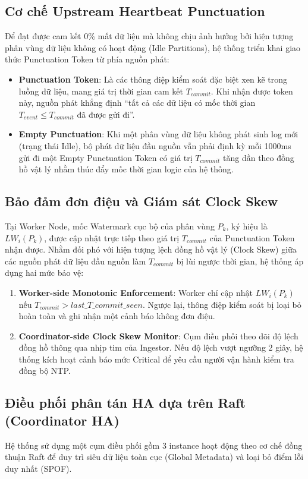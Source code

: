 \documentclass[12pt,a4paper]{article}
\begin{document}
\subsection{Cơ chế Upstream Heartbeat Punctuation}
Để đạt được cam kết 0\% mất dữ liệu mà không chịu ảnh hưởng bởi hiện tượng phân vùng dữ liệu không có hoạt động (Idle Partitions), hệ thống triển khai giao thức Punctuation Token từ phía nguồn phát:
\begin{itemize}
    \item \textbf{Punctuation Token}: Là các thông điệp kiểm soát đặc biệt xen kẽ trong luồng dữ liệu, mang giá trị thời gian cam kết $T_{commit}$. Khi nhận được token này, nguồn phát khẳng định ``tất cả các dữ liệu có mốc thời gian $T_{event} \le T_{commit}$ đã được gửi đi''.
    \item \textbf{Empty Punctuation}: Khi một phân vùng dữ liệu không phát sinh log mới (trạng thái Idle), bộ phát dữ liệu đầu nguồn vẫn phải định kỳ mỗi 1000ms gửi đi một Empty Punctuation Token có giá trị $T_{commit}$ tăng dần theo đồng hồ vật lý nhằm thúc đẩy mốc thời gian logic của hệ thống.
\end{itemize}

\subsection{Bảo đảm đơn điệu và Giám sát Clock Skew}
Tại Worker Node, mốc Watermark cục bộ của phân vùng $P_k$, ký hiệu là $LW_i(P_k)$, được cập nhật trực tiếp theo giá trị $T_{commit}$ của Punctuation Token nhận được. Nhằm đối phó với hiện tượng lệch đồng hồ vật lý (Clock Skew) giữa các nguồn phát dữ liệu đầu nguồn làm $T_{commit}$ bị lùi ngược thời gian, hệ thống áp dụng hai mức bảo vệ:
\begin{enumerate}
    \item \textbf{Worker-side Monotonic Enforcement}: Worker chỉ cập nhật $LW_i(P_k)$ nếu $T_{commit} > last\_T\_commit\_seen$. Ngược lại, thông điệp kiểm soát bị loại bỏ hoàn toàn và ghi nhận một cảnh báo không đơn điệu.
    \item \textbf{Coordinator-side Clock Skew Monitor}: Cụm điều phối theo dõi độ lệch đồng hồ thông qua nhịp tim của Ingestor. Nếu độ lệch vượt ngưỡng 2 giây, hệ thống kích hoạt cảnh báo mức Critical để yêu cầu người vận hành kiểm tra đồng bộ NTP.
\end{enumerate}

\subsection{Điều phối phân tán HA dựa trên Raft (Coordinator HA)}
Hệ thống sử dụng một cụm điều phối gồm 3 instance hoạt động theo cơ chế đồng thuận Raft để duy trì siêu dữ liệu toàn cục (Global Metadata) và loại bỏ điểm lỗi duy nhất (SPOF).
\end{document}
